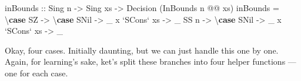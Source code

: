 \documentclass[]{article}
\newenvironment{Shaded}{}{}
\newcommand{\DataTypeTok}[1]{\textcolor[rgb]{0.56,0.13,0.00}{#1}}
\newcommand{\FunctionTok}[1]{\textcolor[rgb]{0.02,0.16,0.49}{#1}}
\newcommand{\KeywordTok}[1]{\textcolor[rgb]{0.00,0.44,0.13}{\textbf{#1}}}
\newcommand{\NormalTok}[1]{#1}
\newcommand{\OtherTok}[1]{\textcolor[rgb]{0.00,0.44,0.13}{#1}}
\begin{document}
\begin{Shaded}
\begin{Highlighting}[]
\OtherTok{inBounds ::} \DataTypeTok{Sing}\NormalTok{ n }\OtherTok{->} \DataTypeTok{Sing}\NormalTok{ xs }\OtherTok{->} \DataTypeTok{Decision}\NormalTok{ (}\DataTypeTok{InBounds}\NormalTok{ n }\FunctionTok{@@}\NormalTok{ xs)}
\NormalTok{inBounds }\FunctionTok{=}\NormalTok{ \textbackslash{}}\KeywordTok{case}
    \DataTypeTok{SZ} \OtherTok{->}\NormalTok{ \textbackslash{}}\KeywordTok{case}
      \DataTypeTok{SNil}         \OtherTok{->}\NormalTok{ _}
\NormalTok{      x }\OtherTok{`SCons`}\NormalTok{ xs }\OtherTok{->}\NormalTok{ _}
    \DataTypeTok{SS}\NormalTok{ n }\OtherTok{->}\NormalTok{ \textbackslash{}}\KeywordTok{case}
      \DataTypeTok{SNil}         \OtherTok{->}\NormalTok{ _}
\NormalTok{      x }\OtherTok{`SCons`}\NormalTok{ xs }\OtherTok{->}\NormalTok{ _}
\end{Highlighting}
\end{Shaded}

Okay, four cases. Initially daunting, but we can just handle this one by one.
Again, for learning's sake, ket's split these branches into four helper
functions --- one for each case.
\end{document}
